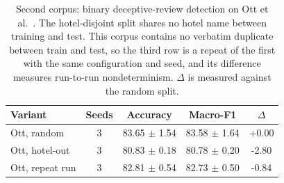\begin{table}[t]
\caption{Second corpus: binary deceptive-review detection on Ott et al.\ \cite{ott2011}. The hotel-disjoint split shares no hotel name between training and test. This corpus contains no verbatim duplicate between train and test, so the third row is a repeat of the first with the same configuration and seed, and its difference measures run-to-run nondeterminism. $\Delta$ is measured against the random split.}
\label{tab:second}
\centering
\small
\begin{tabular}{@{}lcccc@{}}
\toprule
Variant & Seeds & Accuracy & Macro-F1 & $\Delta$ \\
\midrule
Ott, random & 3 & 83.65 $\pm$ 1.54 & 83.58 $\pm$ 1.64 & +0.00 \\
Ott, hotel-out & 3 & 80.83 $\pm$ 0.18 & 80.78 $\pm$ 0.20 & -2.80 \\
Ott, repeat run & 3 & 82.81 $\pm$ 0.54 & 82.73 $\pm$ 0.50 & -0.84 \\

\bottomrule
\end{tabular}
\end{table}
